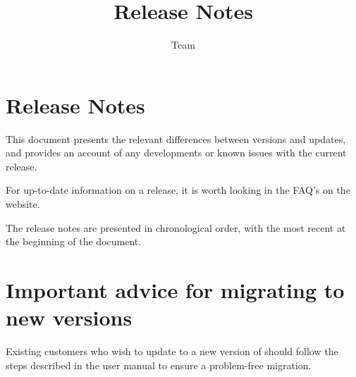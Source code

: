 
\title{\app{} Release Notes}
\author*{\app{} Team}{}
\maketitle

\setcounter{secnumdepth}{0}

\clearpage
\section{\app{} Release Notes}
This document presents the relevant differences between versions and updates, and provides an account of any developments or known issues with the current release. 

For up-to-date information on a release, it is worth looking in the FAQ's on the \app{} website. 

The release notes are presented in chronological order, with the most recent at the beginning of the document.  

\section{Important advice for migrating to new \app{} versions}
Existing customers who wish to update to a new version of \app{} should follow the steps described in the user manual to ensure a problem-free migration.






